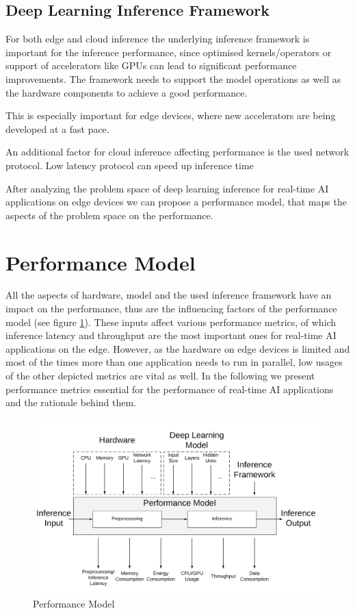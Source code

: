 \subsection{Deep Learning Inference Framework}
For both edge and cloud inference the underlying inference framework is important for the inference performance, since optimised kernels/operators or support of accelerators like GPUs can lead to significant performance improvements.
The framework needs to support the model operations as well as the hardware components to achieve a good performance.


This is especially important for edge devices, where new accelerators are being developed at a fast pace.

An additional factor for cloud inference affecting performance is the used network protocol.
Low latency protocol can speed up inference time 

After analyzing the problem space of deep learning inference for real-time AI applications on edge devices we can propose a performance model, that maps the aspects of the problem space on the performance.



\section{Performance Model}
All the aspects of hardware, model and the used inference framework have an impact on the performance, thus are the influencing factors of the performance model (see figure \ref{fig:perfmodel}). 
These inputs affect various performance metrics, of which inference latency and throughput are the most important ones for real-time AI applications on the edge. However, as the hardware on edge devices is limited and most of the times more than one application needs to run in parallel, low usages of the other depicted metrics are vital as well.
In the following we present performance metrics essential for the performance of real-time AI applications and the rationale behind them.
\begin{figure}[!htb]
\centering
\includegraphics[width=0.99\textwidth]{./Bilder/trade_offs.png}
\caption{Performance Model}
\label{fig:perfmodel}
\end{figure}


